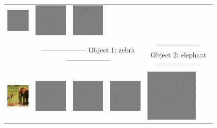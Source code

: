 \begin{figure}
\begin{center}
\begin{tabular}{ccccccc}
\includegraphics[width=0.14\linewidth,height=0.115\linewidth]{figs/examples/googlenet/oxford/bic-car2_diff_672} &
\includegraphics[width=0.14\linewidth,height=0.115\linewidth]{figs/examples/googlenet/deconv/bic-car2_diff_672} &
\includegraphics[width=0.14\linewidth,height=0.115\linewidth]{figs/examples/googlenet/soft/bic-car2_diff_672} \\
& \multicolumn{3}{c}{\small -------------------- Object 1: zebra --------------------} & \multicolumn{3}{c}{\small -------------------- Object 2: elephant --------------------} \\
\vspace{-2.5pt}
\includegraphics[width=0.14\linewidth,height=0.115\linewidth]{figs/examples/googlenet/oxford/zeb-ele1} &
\includegraphics[width=0.14\linewidth,height=0.115\linewidth]{figs/examples/googlenet/oxford/zeb-ele1_diff_341} &
\includegraphics[width=0.14\linewidth,height=0.115\linewidth]{figs/examples/googlenet/deconv/zeb-ele1_diff_341} &
\includegraphics[width=0.14\linewidth,height=0.115\linewidth]{figs/examples/googlenet/soft/zeb-ele1_diff_341} &
\includegraphics[width=0.14\linewidth,height=0.115\linewidth]{figs/examples/googlenet/oxford/zeb-ele1_diff_387} &

\end{tabular}
\end{center}
\end{figure}
